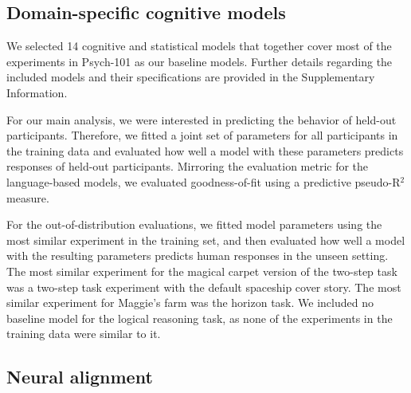 \documentclass[pdflatex,sn-nature]{sn-jnl}%
\theoremstyle{thmstyleone}%
\theoremstyle{thmstyletwo}%
\theoremstyle{thmstylethree}%
\begin{document}
\subsection*{Domain-specific cognitive models}

We selected 14 cognitive and statistical models that together cover most of the experiments in Psych-101 as our baseline models. Further details regarding the included models and their specifications are provided in the Supplementary Information. 

For our main analysis, we were interested in predicting the behavior of held-out participants. Therefore, we fitted a joint set of parameters for all participants in the training data and evaluated how well a model with these parameters predicts responses of held-out participants. Mirroring the evaluation metric for the language-based models, we evaluated goodness-of-fit using a predictive pseudo-R$^2$ measure. 

For the out-of-distribution evaluations, we fitted model parameters using the most similar experiment in the training set, and then evaluated how well a model with the resulting parameters predicts human responses in the unseen setting. The most similar experiment for the magical carpet version of the two-step task was a two-step task experiment with the default spaceship cover story. The most similar experiment for Maggie's farm was the horizon task. We included no baseline model for the logical reasoning task, as none of the experiments in the training data were similar to it.


\subsection*{Neural alignment}
\end{document}

